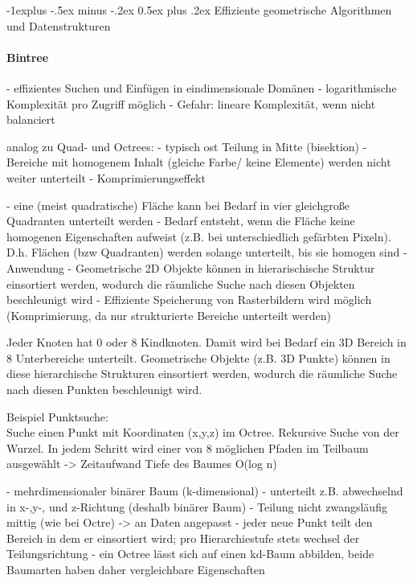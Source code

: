 \documentclass[10pt,landscape]{article}
\makeatletter
\renewcommand{\subsection}{\@startsection{subsection}{2}{0mm}%
                                {-1explus -.5ex minus -.2ex}%
                                {0.5ex plus .2ex}%
                                {\normalfont\normalsize\bfseries}}
\makeatother
\begin{document}
\begin{multicols}{3}
\subsection{ Effiziente geometrische Algorithmen und Datenstrukturen}
\paragraph{Bintree}
- effizientes Suchen und Einfügen in eindimensionale Domänen
- logarithmische Komplexität pro Zugriff möglich
- Gefahr: lineare Komplexität, wenn nicht balanciert

analog zu Quad- und Octrees:
- typisch ost Teilung in Mitte (bisektion)
- Bereiche mit homogenem Inhalt (gleiche Farbe/ keine Elemente) werden nicht weiter unterteilt
- Komprimierungseffekt

- eine (meist quadratische) Fläche kann bei Bedarf in vier gleichgroße Quadranten unterteilt werden
- Bedarf entsteht, wenn die Fläche keine homogenen Eigenschaften aufweist (z.B. bei unterschiedlich gefärbten Pixeln). D.h. Flächen (bzw Quadranten) werden solange unterteilt, bis sie homogen sind
- Anwendung
  - Geometrische 2D Objekte können in hierarischische Struktur einsortiert werden, wodurch die räumliche Suche nach diesen Objekten beschleunigt wird
  - Effiziente Speicherung von Rasterbildern wird möglich (Komprimierung, da nur strukturierte Bereiche unterteilt werden)


Jeder Knoten hat 0 oder 8 Kindknoten. Damit wird bei Bedarf ein 3D Bereich in 8 Unterbereiche unterteilt. Geometrische Objekte (z.B. 3D Punkte) können in diese hierarchische Strukturen einsortiert werden, wodurch die räumliche Suche nach diesen Punkten beschleunigt wird.

Beispiel Punktsuche:\\
Suche einen Punkt mit Koordinaten (x,y,z) im Octree. Rekursive Suche von der Wurzel. In jedem Schritt wird einer von 8 möglichen Pfaden im Teilbaum ausgewählt -> Zeitaufwand Tiefe des Baumes O(log n)

- mehrdimensionaler binärer Baum (k-dimensional)
- unterteilt z.B. abwechselnd in x-,y-, und z-Richtung (deshalb binärer Baum)
- Teilung nicht zwangsläufig mittig (wie bei Octre) -> an Daten angepasst
- jeder neue Punkt teilt den Bereich in dem er einsortiert wird; pro Hierarchiestufe stets wechsel der Teilungsrichtung
- ein Octree lässt sich auf einen kd-Baum abbilden, beide Baumarten haben daher vergleichbare Eigenschaften


\end{multicols}
\end{document}
